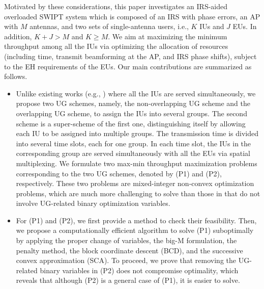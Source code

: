 \documentclass[12pt,draftclsnofoot, onecolumn]{IEEEtran}
\theoremstyle{plain}
\begin{document}
\begin{sloppypar}

Motivated by these considerations, this paper investigates an IRS-aided overloaded SWIPT system which is composed of an IRS with phase errors, an AP with $M$ antennas, and two sets of single-antenna users, i.e., $K$ IUs and $J$ EUs. In addition, $K + J > M$ and $K \geq M$. We aim at maximizing the minimum throughput among all the IUs via optimizing the allocation of resources (including time, transmit beamforming at the AP, and IRS phase shifts), subject to the EH requirements of the EUs. Our main contributions are summarized as follows. 
\begin{itemize}
	\item Unlike existing works (e.g., \cite{2020_Qingqing_SWIPT_letter,2020_Qingqing_SWIPT_QoS,2020_Cunhua_SWIPT,2020_Wei_SWIPT_secure,2021_Shayan_SWIPT}) where all the IUs are served simultaneously, we propose two UG schemes, namely, the non-overlapping UG scheme and the overlapping UG scheme, to assign the IUs into several groups. The second scheme is a super-scheme of the first one, distinguishing itself by allowing each IU to be assigned into multiple groups. %
	The transmission time is divided into several time slots, each for one group. In each time slot, the IUs in the corresponding group are served simultaneously with all the EUs via spatial multiplexing. We formulate two max-min throughput maximization problems corresponding to the two UG schemes, denoted by (P1) and (P2), respectively. These two problems are mixed-integer non-convex optimization problems, which are much more challenging to solve than those in \cite{2020_Qingqing_SWIPT_letter,2020_Qingqing_SWIPT_QoS,2020_Cunhua_SWIPT,2020_Wei_SWIPT_secure,2021_Shayan_SWIPT} that do not involve UG-related binary optimization variables.  
	\item For (P1) and (P2), we first provide a method to check their feasibility. Then, we propose a computationally efficient algorithm to solve (P1) suboptimally by applying the proper change of variables, the big-M formulation, the penalty method, the block coordinate descent (BCD), and the successive convex approximation (SCA). To proceed, we prove that removing the UG-related binary variables in (P2) does not compromise optimality, which reveals that although (P2) is a general case of (P1), it is easier to solve. 

\end{itemize}
\end{sloppypar}
\end{document}
